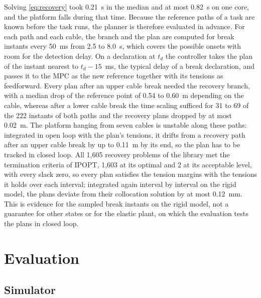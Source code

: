 \documentclass{interact}
\begin{document}
\label{sec:library}Solving \eqref{eq:recovery} took 0.21~s in the median and at most 0.82~s on one core, and the platform falls during that time. Because the reference paths of a task are known before the task runs, the planner is therefore evaluated in advance. For each path and each cable, the branch and the plan are computed for break instants every 50~ms from 2.5 to 8.0~s, which covers the possible onsets with room for the detection delay. On a declaration at $t_d$ the controller takes the plan of the instant nearest to $t_d-15$~ms, the typical delay of a break declaration, and passes it to the MPC as the new reference together with its tensions as feedforward. Every plan after an upper cable break needed the recovery branch, with a median drop of the reference point of 0.54 to 0.60~m depending on the cable, whereas after a lower cable break the time scaling sufficed for 31 to 69 of the 222 instants of both paths and the recovery plans dropped by at most 0.02~m. The platform hanging from seven cables is unstable along these paths: integrated in open loop with the plan's tensions, it drifts from a recovery path after an upper cable break by up to 0.11~m by its end, so the plan has to be tracked in closed loop. All 1,605 recovery problems of the library met the termination criteria of IPOPT, 1,603 at its optimal and 2 at its acceptable level, with every slack zero, so every plan satisfies the tension margins with the tensions it holds over each interval; integrated again interval by interval on the rigid model, the plans deviate from their collocation solution by at most 0.12~mm. This is evidence for the sampled break instants on the rigid model, not a guarantee for other states or for the elastic plant, on which the evaluation tests the plans in closed loop.

\section{Evaluation}\label{sec:evaluation}

\subsection{Simulator}\label{sec:simulator}
\end{document}
